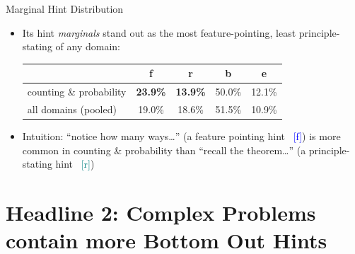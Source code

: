 \documentclass[10pt,aspectratio=169]{beamer}
\newcommand{\hf}{\textcolor{blue}{[f]}}
\newcommand{\hr}{\textcolor{teal}{[r]}}
\begin{document}
\begin{frame}{Marginal Hint Distribution}
  \begin{itemize}
    \item Its hint \emph{marginals} stand out as the most feature-pointing, least principle-stating of any domain: 
      \begin{center}
        \small
        \begin{tabular}{lcccc}
          \toprule
          & f & r & b & e \\
          \midrule
          counting \& probability & \textbf{23.9\%} & \textbf{13.9\%} & 50.0\% & 12.1\% \\
          all domains (pooled)    & 19.0\% & 18.6\% & 51.5\% & 10.9\% \\
          \bottomrule
        \end{tabular}
      \end{center}
       
      \medskip 
    \item Intuition: ``notice how many ways\ldots'' (a feature pointing hint ~\hf) is more common in counting \& probability than ``recall the theorem\ldots'' (a principle-stating hint ~\hr)
  \end{itemize}
\end{frame}

\section{Headline 2: Complex Problems contain more Bottom Out Hints}
\end{document}

